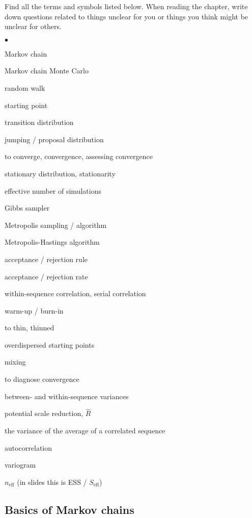 \documentclass[a4paper,11pt,english]{article}
\begin{document}
Find all the terms and symbols listed below. When reading the chapter,
write down questions related to things unclear for you or things you
think might be unclear for others. 
\begin{list}{$\bullet$}{\parsep=0pt\itemsep=2pt}
\item Markov chain
\item Markov chain Monte Carlo
\item random walk
\item starting point
\item transition distribution
\item jumping / proposal distribution
\item to converge, convergence, assessing convergence
\item stationary distribution, stationarity
\item effective number of simulations
\item Gibbs sampler
\item Metropolis sampling / algorithm
\item Metropolis-Hastings algorithm
\item acceptance / rejection rule
\item acceptance / rejection rate
\item within-sequence correlation, serial correlation
\item warm-up / burn-in
\item to thin, thinned
\item overdispersed starting points
\item mixing
\item to diagnose convergence
\item between- and within-sequence variances
\item potential scale reduction, $\widehat{R}$
\item the variance of the average of a correlated sequence
\item autocorrelation
\item variogram
\item $n_{\mathrm{eff}}$ (in slides this is ESS / $S_{\mathrm{eff}}$)
\end{list}

\subsection*{Basics of Markov chains}
\end{document}
